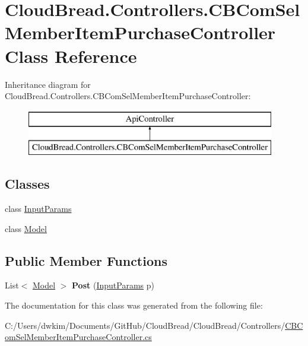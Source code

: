 \hypertarget{a00033}{}\section{Cloud\+Bread.\+Controllers.\+C\+B\+Com\+Sel\+Member\+Item\+Purchase\+Controller Class Reference}
\label{a00033}
Inheritance diagram for Cloud\+Bread.\+Controllers.\+C\+B\+Com\+Sel\+Member\+Item\+Purchase\+Controller\+:\begin{figure}[H]
\begin{center}
\leavevmode
\includegraphics[height=2.000000cm]{a00033}
\end{center}
\end{figure}
\subsection*{Classes}
\begin{DoxyCompactItemize}
\item 
class \hyperlink{a00123}{Input\+Params}
\item 
class \hyperlink{a00153}{Model}
\end{DoxyCompactItemize}
\subsection*{Public Member Functions}
\begin{DoxyCompactItemize}
\item 
List$<$ \hyperlink{a00153}{Model} $>$ {\bfseries Post} (\hyperlink{a00123}{Input\+Params} p)\hypertarget{a00033_a465f776801d7078ce72ee87ebb05992b}{}\label{a00033_a465f776801d7078ce72ee87ebb05992b}

\end{DoxyCompactItemize}


The documentation for this class was generated from the following file\+:\begin{DoxyCompactItemize}
\item 
C\+:/\+Users/dwkim/\+Documents/\+Git\+Hub/\+Cloud\+Bread/\+Cloud\+Bread/\+Controllers/\hyperlink{a00206}{C\+B\+Com\+Sel\+Member\+Item\+Purchase\+Controller.\+cs}\end{DoxyCompactItemize}
